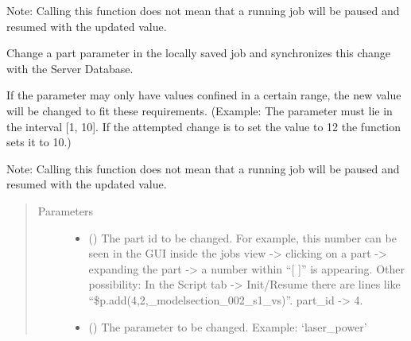 \documentclass[letterpaper,10pt,english,openany,oneside]{sphinxmanual}
\begin{document}
\begin{fulllineitems}
\begin{fulllineitems}
\begin{quote}
\begin{description}
\begin{itemize}
\end{itemize}

\end{description}\end{quote}

Note: Calling this function does not mean that a running job
will be paused and resumed with the updated value.

\end{fulllineitems}


\begin{fulllineitems}
\label{\detokenize{_modules/AconitySTUDIO_client:AconitySTUDIO_client.AconitySTUDIO_client.change_part_parameter}}
Change a part parameter in the locally saved job and synchronizes this change with the Server Database.

If the parameter may only have values confined in a certain range, the new value will be changed to fit these requirements.
(Example: The parameter must lie in the interval {[}1, 10{]}. If the attempted change is to set the value to 12 the function sets it to 10.)

Note: Calling this function does not mean that a running job
will be paused and resumed with the updated value.
\begin{quote}\begin{description}
\item[{Parameters}] \leavevmode\begin{itemize}
\item {} 
 () \textendash{} The part id to be changed. For example, this number can be seen
in the GUI inside the jobs view -\textgreater{} clicking on a part -\textgreater{} expanding the part -\textgreater{}
a number within “{[} {]}” is appearing.
Other possibility: In the Script tab -\textgreater{} Init/Resume there are lines like
“\$p.add(4,2,\_modelsection\_002\_s1\_vs)”. part\_id -\textgreater{} 4.

\item {} 
 () \textendash{} The parameter to be changed. Example: ‘laser\_power’


\end{itemize}
\end{description}
\end{quote}
\end{fulllineitems}
\end{fulllineitems}
\end{document}
